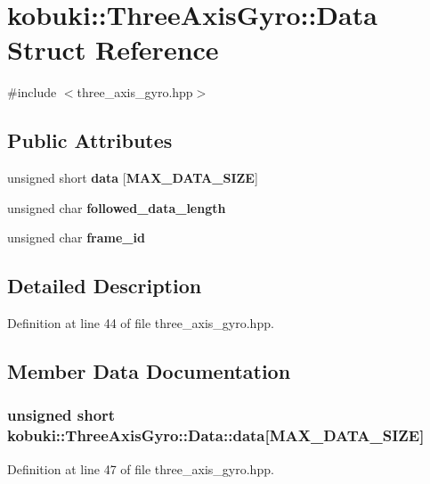 \section{kobuki\-:\-:\-Three\-Axis\-Gyro\-:\-:\-Data \-Struct \-Reference}
\label{structkobuki_1_1ThreeAxisGyro_1_1Data}


{\ttfamily \#include $<$three\-\_\-axis\-\_\-gyro.\-hpp$>$}

\subsection*{\-Public \-Attributes}
\begin{DoxyCompactItemize}
\item 
unsigned short {\bf data} [{\bf \-M\-A\-X\-\_\-\-D\-A\-T\-A\-\_\-\-S\-I\-Z\-E}]
\item 
unsigned char {\bf followed\-\_\-data\-\_\-length}
\item 
unsigned char {\bf frame\-\_\-id}
\end{DoxyCompactItemize}


\subsection{\-Detailed \-Description}


\-Definition at line 44 of file three\-\_\-axis\-\_\-gyro.\-hpp.



\subsection{\-Member \-Data \-Documentation}
\subsubsection[{data}]{\setlength{\rightskip}{0pt plus 5cm}unsigned short {\bf kobuki\-::\-Three\-Axis\-Gyro\-::\-Data\-::data}[{\bf \-M\-A\-X\-\_\-\-D\-A\-T\-A\-\_\-\-S\-I\-Z\-E}]}\label{structkobuki_1_1ThreeAxisGyro_1_1Data_a8c679a4e0d0b6969b0d5c28574525e30}


\-Definition at line 47 of file three\-\_\-axis\-\_\-gyro.\-hpp.


